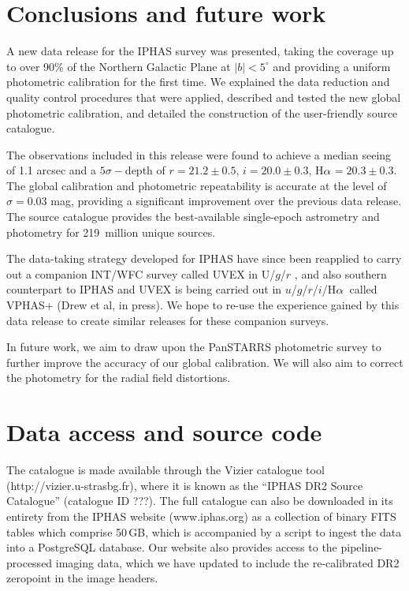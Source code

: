\documentclass[useAMS,usenatbib]{mn2e}
\def\ha{\mbox{H$\rm \alpha$}}
\begin{document}
\section{Conclusions and future work}
\label{sec:conclusions}

A new data release for the IPHAS survey was presented,
taking the coverage up to over 90\% of the Northern Galactic Plane 
at $|b|<5^\circ$
and providing a uniform photometric calibration
for the first time.
We explained the data reduction and quality control procedures that
were applied, described and tested the new global photometric calibration,
and detailed the construction of the user-friendly source catalogue.

The observations included in this release
were found to achieve a median seeing of 1.1 arcsec
and a $5\sigma-$depth of $r=21.2\pm 0.5$, $i=20.0\pm 0.3$, \ha$=20.3\pm 0.3$.
The global calibration and photometric repeatability
is accurate at the level of $\sigma=0.03$ mag,
providing a significant improvement over the 
previous data release.
The source catalogue provides the best-available
single-epoch astrometry and photometry
for 219~million unique sources.

The data-taking strategy developed for IPHAS
have since been reapplied to carry out a companion INT/WFC survey called UVEX
in U/$g$/$r$ \citep{Groot2009},
and also southern counterpart to IPHAS and UVEX 
is being carried out in $u$/$g$/$r$/$i$/\ha\ 
called VPHAS+ (Drew et al, in press).
We hope to re-use the experience gained by this data release
to create similar releases for these companion surveys.

In future work, we aim to draw upon the PanSTARRS photometric
survey to further improve the accuracy of our global calibration.
We will also aim to correct the photometry for the
radial field distortions.


\section*{Data access and source code}
\label{sec:dataaccess}

The catalogue is made available through the Vizier
catalogue tool (http://vizier.u-strasbg.fr),
where it is known as the ``IPHAS DR2 Source Catalogue''
(catalogue ID ???).
The full catalogue can also be downloaded in its entirety
from the IPHAS website (www.iphas.org) as a collection 
of binary FITS tables which comprise 50\,GB,
which is accompanied by a script
to ingest the data into a PostgreSQL database.
Our website also provides access to the pipeline-processed
imaging data, which we have updated to include
the re-calibrated DR2 zeropoint in the image headers.
\end{document}
